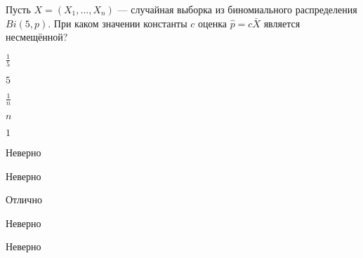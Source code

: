 
\begin{question}
Пусть \(X = (X_1, \ldots , X_n)\) — случайная выборка из биномиального
распределения \(Bi(5, p)\). При каком значении константы \(c\) оценка
\(\hat{p} = c \bar{X}\) является несмещённой?
\begin{answerlist}
  \item \(\frac{1}{5}\)
  \item \(5\)
  \item \(\frac{1}{n}\)
  \item \(n\)
  \item \(1\)
\end{answerlist}
\end{question}

\begin{solution}
\begin{answerlist}
  \item Неверно
  \item Неверно
  \item Отлично
  \item Неверно
  \item Неверно
\end{answerlist}
\end{solution}

